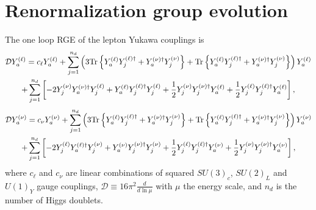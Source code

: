 \documentclass[12pt,a4paper]{article}
\begin{document}
\section{Renormalization group evolution\label{APP:RGE}}
The one loop RGE of the lepton Yukawa couplings is
\begin{multline}\label{eq:RGE:YL:00}
 \mathcal D \YL{a}=c_{\ell}\YL{a}+\sum_{j=1}^{n_d}\left(3\TR{\YL{a}\YLd{j}+\YNd{a}\YN{j}}+\TR{\YL{a}\YLd{j}+\YNd{a}\YN{j}}\right)\YL{a}\\ +\sum_{j=1}^{n_d}\left[-2\YN{j}\YNd{a}\YL{j}+\YL{a}\YLd{j}\YL{j}+\frac{1}{2}\YN{j}\YNd{j}\YL{a}+\frac{1}{2}\YL{j}\YLd{j}\YL{a}\right],
\end{multline}
%
\begin{multline}\label{eq:RGE:YN:00}
 \mathcal D \YN{a}=c_{\nu}\YN{a}+\sum_{j=1}^{n_d}\left(3\TR{\YL{a}\YLd{j}+\YNd{a}\YN{j}}+\TR{\YL{a}\YLd{j}+\YNd{a}\YN{j}}\right)\YN{a}\\ +\sum_{j=1}^{n_d}\left[-2\YL{j}\YLd{a}\YN{j}+\YN{a}\YNd{j}\YN{j}+\frac{1}{2}\YL{j}\YLd{j}\YN{a}+\frac{1}{2}\YN{j}\YNd{j}\YN{a}\right],
\end{multline}
where $c_{\ell}$ and $c_{\nu}$ are linear combinations of squared $SU(3)_c$, $SU(2)_L$ and $U(1)_Y$ gauge couplings, $\mathcal D\equiv 16\pi^2\frac{d}{d\ln\mu}$ with $\mu$ the energy scale, and $n_d$ is the number of Higgs doublets.
\end{document}

